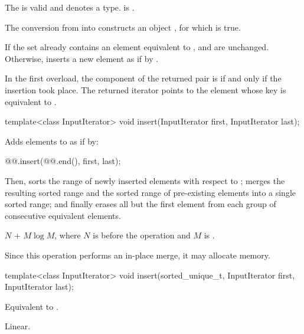 \begin{itemdescr}
\pnum
\constraints
The  
is valid and denotes a type.
 is .

\pnum
\expects
The conversion from  into  constructs
an object , for which  is true.

\pnum
\effects
If the set already contains an element equivalent to ,
 and  are unchanged.
Otherwise,
inserts a new element as if by .

\pnum
\returns
In the first overload,
the  component of the returned pair is 
if and only if the insertion took place.
The returned iterator points to the element
whose key is equivalent to .
\end{itemdescr}

%
\begin{itemdecl}
template<class InputIterator>
  void insert(InputIterator first, InputIterator last);
\end{itemdecl}

\begin{itemdescr}
\pnum
\effects
Adds elements to  as if by:
\begin{codeblock}
@@.insert(@@.end(), first, last);
\end{codeblock}
Then,
sorts the range of newly inserted elements with respect to ;
merges the resulting sorted range and
the sorted range of pre-existing elements into a single sorted range; and
finally erases all but the first element
from each group of consecutive equivalent elements.

\pnum
\complexity
$N$ + $M \log M$, where $N$ is  before the operation and
$M$ is .

\pnum
\remarks
Since this operation performs an in-place merge, it may allocate memory.
\end{itemdescr}

%
\begin{itemdecl}
template<class InputIterator>
  void insert(sorted_unique_t, InputIterator first, InputIterator last);
\end{itemdecl}

\begin{itemdescr}
\pnum
\effects
Equivalent to .

\pnum
\complexity
Linear.
\end{itemdescr}

